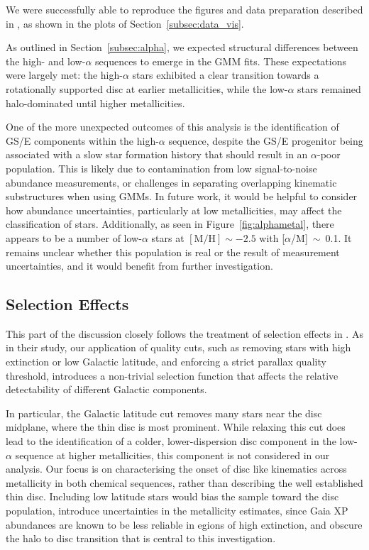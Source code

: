 \documentclass[a4paper,12pt]{article}
\begin{document}
We were successfully able to reproduce the figures and data preparation described in \citet{Vis2024}, as shown in the plots of 
Section~\ref{subsec:data_vis}.

As outlined in Section~\ref{subsec:alpha}, we expected structural differences between the high- and low-$\alpha$ sequences 
to emerge in the GMM fits. These expectations were largely met: the high-$\alpha$ stars exhibited a clear transition 
towards a rotationally supported disc at earlier metallicities, while the low-$\alpha$ stars remained halo-dominated 
until higher metallicities.

One of the more unexpected outcomes of this analysis is the identification of GS/E components within the 
high-$\alpha$ sequence, despite the GS/E progenitor being associated with a slow star formation 
history that should result in an $\alpha$-poor population. This is likely due to contamination from 
low signal-to-noise abundance measurements, or challenges in separating overlapping kinematic substructures 
when using GMMs. In future work, it would be helpful to consider how abundance uncertainties, particularly at low 
metallicities, may affect the classification of stars. Additionally, as seen in Figure~\ref{fig:alphametal}, 
there appears to be a number of low-$\alpha$ stars at $[\mathrm{M/H}]\sim-2.5$ with 
[$\alpha$/M]~$\sim$~0.1. It remains unclear whether this population is real or the result of measurement 
uncertainties, and it would benefit from further investigation.


\subsection{Selection Effects} \label{subsec:selection_effects}

This part of the discussion closely follows the treatment of selection effects in 
\citet{zhang2024existencemetalpoordiscmilky}. As in their study, our application of quality cuts, such 
as removing stars with high extinction or low Galactic latitude, and enforcing a strict parallax quality 
threshold, introduces a non-trivial selection function that affects the relative detectability of 
different Galactic components.

In particular, the Galactic latitude cut removes many stars near the disc midplane, where the 
thin disc is most prominent. While relaxing this cut does lead to the identification of a
colder, lower-dispersion disc component in the low-$\alpha$ sequence at higher metallicities, this 
component is not considered in our analysis. Our focus is on characterising the onset of disc like 
kinematics across metallicity in both chemical sequences, rather than describing the well established 
thin disc. Including low latitude stars would bias the sample toward the disc population, introduce 
uncertainties in the metallicity estimates, since Gaia XP abundances are known to be less reliable in 
egions of high extinction, and obscure the halo to disc transition that is central to this investigation.
\end{document}
